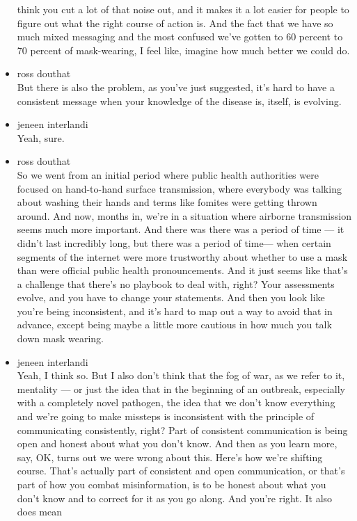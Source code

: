 \begin{itemize}
  think you cut a lot of that noise out, and it makes it a lot easier
  for people to figure out what the right course of action is. And the
  fact that we have so much mixed messaging and the most confused we've
  gotten to 60 percent to 70 percent of mask-wearing, I feel like,
  imagine how much better we could do.
\item
  ross douthat\\
  But there is also the problem, as you've just suggested, it's hard to
  have a consistent message when your knowledge of the disease is,
  itself, is evolving.
\item
  jeneen interlandi\\
  Yeah, sure.
\item
  ross douthat\\
  So we went from an initial period where public health authorities were
  focused on hand-to-hand surface transmission, where everybody was
  talking about washing their hands and terms like fomites were getting
  thrown around. And now, months in, we're in a situation where airborne
  transmission seems much more important. And there was there was a
  period of time --- it didn't last incredibly long, but there was a
  period of time--- when certain segments of the internet were more
  trustworthy about whether to use a mask than were official public
  health pronouncements. And it just seems like that's a challenge that
  there's no playbook to deal with, right? Your assessments evolve, and
  you have to change your statements. And then you look like you're
  being inconsistent, and it's hard to map out a way to avoid that in
  advance, except being maybe a little more cautious in how much you
  talk down mask wearing.
\item
  jeneen interlandi\\
  Yeah, I think so. But I also don't think that the fog of war, as we
  refer to it, mentality --- or just the idea that in the beginning of
  an outbreak, especially with a completely novel pathogen, the idea
  that we don't know everything and we're going to make missteps is
  inconsistent with the principle of communicating consistently, right?
  Part of consistent communication is being open and honest about what
  you don't know. And then as you learn more, say, OK, turns out we were
  wrong about this. Here's how we're shifting course. That's actually
  part of consistent and open communication, or that's part of how you
  combat misinformation, is to be honest about what you don't know and
  to correct for it as you go along. And you're right. It also does mean

\end{itemize}
